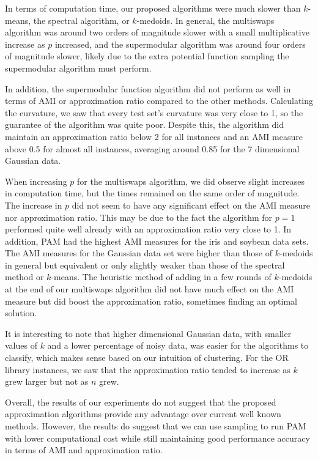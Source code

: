 \documentclass{article}
\begin{document}
In terms of computation time, our proposed algorithms were much slower than $k$-means, the spectral algorithm, or $k$-medoids. In general, the multiswaps algorithm was around two orders of magnitude slower with a small multiplicative increase as $p$ increased, and the supermodular algorithm was around four orders of magnitude slower, likely due to the extra potential function sampling the supermodular algorithm must perform. 

In addition, the supermodular function algorithm did not perform as well in terms of AMI or approximation ratio compared to the other methods. Calculating the curvature, we saw that every  test set's curvature was very close to 1, so the guarantee of the algorithm was quite poor. Despite this, the algorithm did maintain an approximation ratio below 2 for all instances and an AMI measure above 0.5 for almost all instances, averaging around 0.85 for the 7 dimensional Gaussian data. 

When increasing $p$ for the multiswaps algorithm, we did observe slight increases in computation time, but the times remained on the same order of magnitude. The increase in $p$ did not seem to have any significant effect on the AMI measure nor approximation ratio. This may be due to the fact the algorithm for $p=1$ performed quite well already with an approximation ratio very close to 1. In addition, PAM had the highest AMI measures for the iris and soybean data sets. The AMI measures for the Gaussian data set were higher than those of $k$-medoids in general but equivalent or only slightly weaker than those of the spectral method or $k$-means. The heuristic method of adding in a few rounds of $k$-medoids at the end of our multiswaps algorithm did not have much effect on the AMI measure but did boost the approximation ratio, sometimes finding an optimal solution. 

It is interesting to note that higher dimensional Gaussian data, with smaller values of $k$ and a lower percentage of noisy data, was easier for the algorithms to classify, which makes sense based on our intuition of clustering. For the OR library instances, we saw that the approximation ratio tended to increase as $k$ grew larger but not as $n$ grew. 

Overall, the results of our experiments do not suggest that the proposed approximation algorithms provide any advantage over current well known methods. However, the results do suggest that we can use sampling to run PAM with lower computational cost while still maintaining good performance accuracy in terms of AMI and approximation ratio. 
\end{document}
